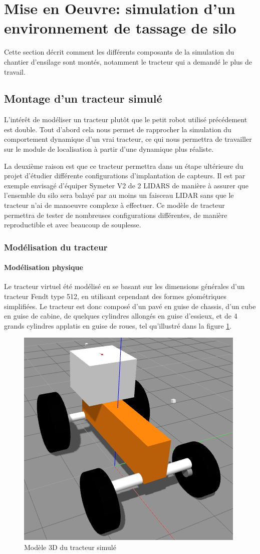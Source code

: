 \documentclass[12pt,a4paper]{report}
\begin{document}
		
	\section{Mise en Oeuvre: simulation d'un environnement de tassage de silo}
	
	Cette section décrit comment les différents composants de la simulation du chantier d'ensilage sont montés, notamment le tracteur qui a demandé le plus de travail.
	  
		\subsection{Montage d'un tracteur simulé}
		L'intérêt de modéliser un tracteur plutôt que le petit robot utilisé précédement est double. Tout d'abord cela nous permet de rapprocher la simulation du comportement dynamique d'un vrai tracteur, ce qui nous permettra de travailler sur le module de localisation à partir d'une dynamique plus réaliste. 
		
		\para La deuxième raison est que ce tracteur permettra dans un étape ultérieure du projet d'étudier différente configurations d'implantation de capteurs. Il est par exemple envisagé d'équiper Symeter V2 de 2 LIDARS de manière à assurer que l'ensemble du silo sera balayé par au moins un faisceau LIDAR sans que le tracteur n'ai de manoeuvre complexe à effectuer. Ce modèle de tracteur permettra de tester de nombreuses configurations différentes, de manière reproductible et avec beaucoup de souplesse.
		
		\subsubsection{Modélisation du tracteur}
			\paragraph{Modélisation physique}
			Le tracteur virtuel été modélisé en se basant sur les dimensions générales d'un tracteur Fendt type 512, en utilisant cependant des formes géométriques simplifiées. Le tracteur est donc composé d'un pavé en guise de chassis, d'un cube en guise de cabine, de quelques cylindres allongés en guise d'essieux, et de 4 grands cylindres applatis en guise de roues, tel qu'illustré dans la figure \ref{fig:tracteur3d}. 
			
			\begin{figure}[h!]
				\centering
				\includegraphics[width=0.4\linewidth]{img/tracteur3d}
				\caption[tracteur3d]{Modèle 3D du tracteur simulé}
				\label{fig:tracteur3d}
			\end{figure}
		
\end{document}
